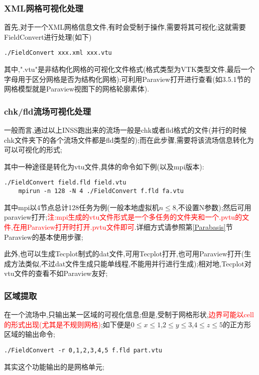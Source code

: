 \subsubsection{XML网格可视化处理}
首先,对于一个XML网格信息文件,有时会受制于操作,需要将其可视化;这就需要FieldConvert进行处理(如下)
\begin{lstlisting}[frame=single]
	./FieldConvert xxx.xml xxx.vtu
\end{lstlisting}
\par
其中,".vtu"是非结构化网格的可视化文件格式(格式类型为VTK类型文件,最后一个字母用于区分网格是否为结构化网格);可利用Paraview打开进行查看(如3.5.1节的网格模型就是Paraview视图下的网格轮廓素体).

\subsubsection{chk/fld流场可视化处理}

一般而言,通过以上INSS跑出来的流场一般是chk或者fld格式的文件(并行的时候chk文件夹下的各个流场文件都是fld类型的);而在此步骤,需要将该流场信息转化为可以可视化的形式;\par
其中一种途径是转化为vtu文件,具体的命令如下例(以及mpi版本):
\begin{lstlisting}[frame=single]
	./FieldConvert field.fld field.vtu
	mpirun -n 128 -N 4 ./FieldConvert f.fld fa.vtu
\end{lstlisting}
\par

其中mpi以4节点总计128任务为例(一般本地虚拟机$n \leq 8$,不设置N参数);然后可用paraview打开;\textcolor{red}{注:mpi生成的vtu文件形式是一个多任务的文件夹和一个.pvtu的文件,在用Paraview打开时打开.pvtu文件即可}.详细方式请参照第\ref{Parabasis}节Paraview的基本使用步骤;\par

此外,也可以生成Tecplot制式的dat文件,可用Tecplot打开,也可用Paraview打开(生成方法类似,不过dat文件生成只能单线程,不能用并行进行生成);相对地,Tecplot对vtu文件的查看不如Paraview友好;


\subsubsection{区域提取}
在一个流场中,只输出某一区域的可视化信息;但是,受制于网格形状,\textcolor{red}{边界可能以cell的形式出现(尤其是不规则网格)};如下便是$0\leq x \leq 1$,$2\leq y \leq 3$,$4\leq z \leq 5$的正方形区域的输出命令;

\begin{lstlisting}[frame=single]
	./FieldConvert -r 0,1,2,3,4,5 f.fld part.vtu
\end{lstlisting}
\par
其实这个功能输出的是网格单元;

